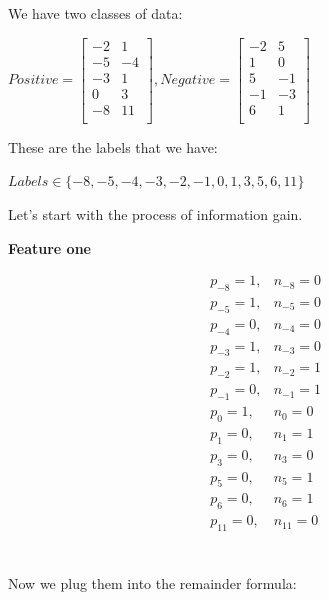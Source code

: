 \documentclass[12pt]{article}
\begin{document}
We have two classes of data:
\begin{center}
$
Positive =
\begin{bmatrix}
-2 & 1\\
-5 & -4\\
-3 & 1\\
0 & 3\\
-8 & 11\\
\end{bmatrix}
, Negative =
\begin{bmatrix}
-2 & 5\\
1 & 0\\
5 & -1\\
-1 & -3\\
6 & 1\\
\end{bmatrix}
$
\\[0.1 in]
\end{center}

These are the labels that we have:
\begin{center}
$
Labels\in\{-8, -5,-4,-3,-2,-1,0,1,3,5,6,11\}
$
\\[0.1 in]
\end{center}
\noindent
Let's start with the process of information gain.

\noindent
\textbf{Feature one}
\begin{center}

\begin{align*}
&p_{-8}=1, &n_{-8}=0\\
&p_{-5}=1, &n_{-5}=0\\
&p_{-4}=0, &n_{-4}=0\\
&p_{-3}=1, &n_{-3}=0\\
&p_{-2}=1, &n_{-2}=1\\
&p_{-1}=0, &n_{-1}=1\\
&p_{0}=1, &n_{0}=0\\
&p_{1}=0, &n_{1}=1\\
&p_{3}=0, &n_{3}=0\\
&p_{5}=0, &n_{5}=1\\
&p_{6}=0, &n_{6}=1\\
&p_{11}=0, &n_{11}=0\\
\end{align*}
\\[0.1 in]
\end{center}

\noindent

Now we plug them into the remainder formula:
\end{document}
